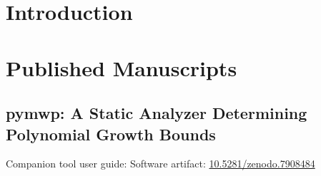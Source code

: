 \dedication{}

\begin{abstract}

\end{abstract}

\mainmatter

\chapter{Introduction}\label{introduction}


\chapter{Published Manuscripts}\label{published-manuscripts}

\clearpage
\section{pymwp: A Static Analyzer Determining Polynomial Growth Bounds}\label{sec:atva}
{\noindent Companion tool user guide: 
\newline\noindent Software artifact: \href{https://doi.org/10.5281/zenodo.7908484}{10.5281/zenodo.7908484}}

